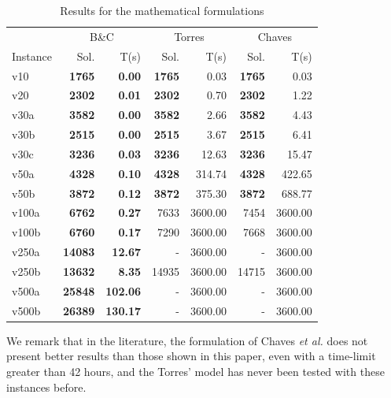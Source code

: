 \documentclass{ro}
\begin{document}
\begin{table}[!ht]
	\centering
	\caption{Results for the mathematical formulations}
	\label{tab:chaves-for}
	\begin{tabular}{lrrrrrr}
		\hline
		& \multicolumn{2}{c}{B\&C} & \multicolumn{2}{c}{Torres} & \multicolumn{2}{c}{Chaves } \\ 
		Instance & Sol. & T(s) & Sol. & T(s) & Sol. & T(s) \\\hline
		v10 & \textbf{1765} & \textbf{0.00} & \textbf{1765} & 0.03 & \textbf{1765} & 0.03 \\
		v20 & \textbf{2302} & \textbf{0.01} & \textbf{2302} & 0.70 & \textbf{2302} & 1.22 \\
		v30a & \textbf{3582} & \textbf{0.00} & \textbf{3582} & 2.66 & \textbf{3582} & 4.43 \\
		v30b & \textbf{2515} & \textbf{0.00} & \textbf{2515} & 3.67 & \textbf{2515} & 6.41 \\
		v30c & \textbf{3236} & \textbf{0.03} & \textbf{3236} & 12.63 & \textbf{3236} & 15.47 \\
		v50a & \textbf{4328} & \textbf{0.10} & \textbf{4328} & 314.74 & \textbf{4328} & 422.65 \\
		v50b & \textbf{3872} & \textbf{0.12} & \textbf{3872} & 375.30 & \textbf{3872} & 688.77 \\
		v100a & \textbf{6762} & \textbf{0.27} & 7633 & 3600.00 & 7454 & 3600.00 \\
		v100b & \textbf{6760} & \textbf{0.17} & 7290 & 3600.00 & 7668 & 3600.00 \\
		v250a & \textbf{14083} & \textbf{12.67} & - & 3600.00 & - & 3600.00 \\
		v250b & \textbf{13632} & \textbf{8.35} & 14935 & 3600.00 & 14715 & 3600.00 \\
		v500a & \textbf{25848} & \textbf{102.06} & - & 3600.00 & - & 3600.00 \\
		v500b & \textbf{26389} & \textbf{130.17} & - & 3600.00 & - & 3600.00 \\
		\hline
	\end{tabular}
\end{table}




We remark that in the literature, the formulation of Chaves \textit{et al.} \cite{chaves2005hybrid} does not present better results than those shown in this paper, even with a time-limit greater than 42 hours, and the Torres' model has never been tested with these instances before.
\end{document}
